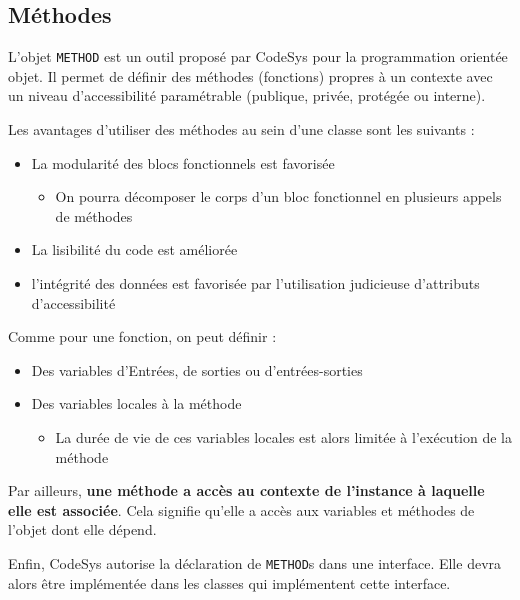 \subsection{Méthodes}
\label{subsec:methodes}
L'objet \lstinline{METHOD} est un outil proposé par CodeSys pour la programmation orientée objet. Il permet de définir des méthodes (fonctions) propres à un contexte avec un niveau d'accessibilité paramétrable (publique, privée, protégée ou interne).

Les avantages d'utiliser des méthodes au sein d'une classe sont les suivants : 
\begin{itemize}
    \item La modularité des blocs fonctionnels est favorisée
    \begin{itemize}
        \item On pourra décomposer le corps d'un bloc fonctionnel en plusieurs appels de méthodes
    \end{itemize}
    \item La lisibilité du code est améliorée
    \item l'intégrité des données est favorisée par l'utilisation judicieuse d'attributs d'accessibilité
\end{itemize}

Comme pour une fonction, on peut définir :
\begin{itemize}
    \item Des variables d'Entrées, de sorties ou d'entrées-sorties
    \item Des variables locales à la méthode
          \begin{itemize}
              \item La durée de vie de ces variables locales est alors limitée à l'exécution de la méthode
          \end{itemize}
\end{itemize}

Par ailleurs, \textbf{une méthode a accès au contexte de l'instance à laquelle elle est associée}. Cela signifie qu'elle a accès aux variables et méthodes de l'objet dont elle dépend.

Enfin, CodeSys autorise la déclaration de \lstinline{METHOD}s dans une interface. Elle devra alors être implémentée dans les classes qui implémentent cette interface.


